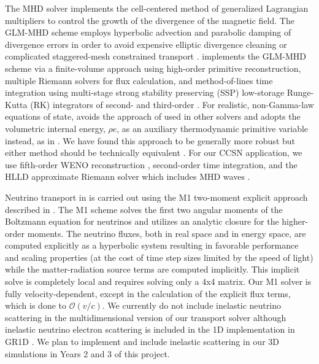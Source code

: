 \documentclass[12pt]{article}
\begin{document}
The \spark MHD solver \citep{couch:2018} implements the cell-centered method of generalized Lagrangian multipliers \citep[GLM;][]{Dedner:2002, Mignone:2010} to control the growth of the divergence of the magnetic field. 
The GLM-MHD scheme employs hyperbolic advection and parabolic damping of divergence errors in order to avoid expensive elliptic divergence cleaning \citep[e.g.,][]{Jiang:1999} or complicated staggered-mesh constrained transport \citep[e.g.,][]{Gardiner:2005, Lee:2009a, Lee:2013}.
\spark implements the GLM-MHD scheme via a finite-volume approach using high-order primitive reconstruction, multiple Riemann solvers for flux calculation, and method-of-lines time integration using multi-stage strong stability preserving (SSP) low-storage Runge-Kutta (RK) integrators of second- and third-order \citep[e.g.,][]{Gottlieb:1998}.
For realistic, non-Gamma-law equations of state, \spark avoids the approach of \citet{Colella:1985} used in other \flash solvers and adopts the volumetric internal energy, $\rho e$, as an auxiliary thermodynamic primitive variable instead, as in \citet{Almgren:2010}.
We have found this approach to be generally more robust but either method should be technically equivalent \citep[e.g.,][]{Zingale:2015}.
For our CCSN application, we use fifth-order WENO reconstruction \citep{Borges:2008}, second-order time integration, and the HLLD approximate Riemann solver which includes MHD waves \citep{Miyoshi:2005}.



Neutrino transport in \sparkmone is carried out using the M1 two-moment explicit approach described in \citet{oconnor:2015, oconnor:2018, oconnor:2018b}. 
The M1 scheme solves the first two angular moments of the Boltzmann equation for neutrinos and utilizes an analytic closure for the higher-order moments.
The neutrino fluxes, both in real space and in energy space, are computed explicitly as a hyperbolic system resulting in favorable performance and scaling properties (at the cost of time step sizes limited by the speed of light) while the matter-radiation source terms are computed implicitly.
This implicit solve is completely local and requires solving only a 4x4 matrix.
Our M1 solver is fully velocity-dependent, except in the calculation of the explicit flux terms, which is done to $\mathcal{O}(v/c)$.
We currently do not include inelastic neutrino scattering in the multidimensional version of our transport solver although inelastic neutrino electron scattering is included in the 1D implementation in GR1D \citep{oconnor:2015}.
We plan to implement and include inelastic scattering in our 3D simulations in Years 2 and 3 of this project.
\end{document}
